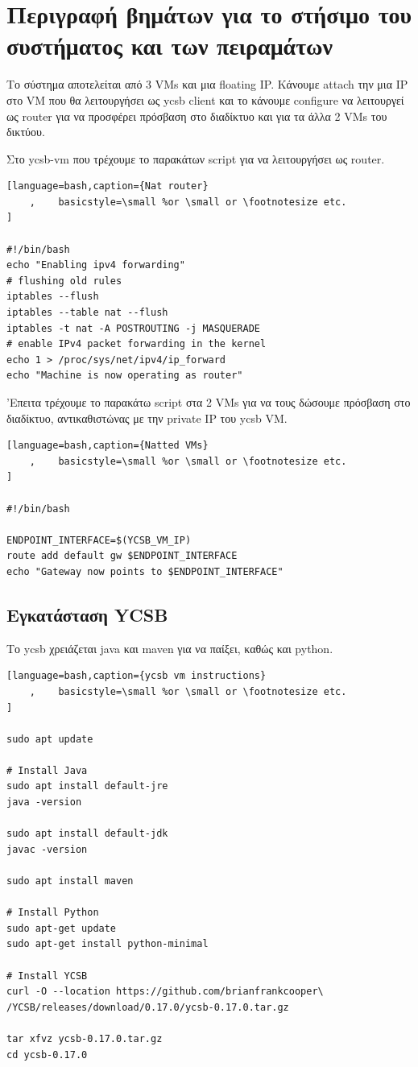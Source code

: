 \documentclass[conference]{IEEEtran}
\begin{document}
\section{Περιγραφή βημάτων για το στήσιμο του συστήματος και των πειραμάτων}
Το σύστημα αποτελείται από 3 VMs και μια floating IP. Κάνουμε attach την μια IP 
στο VM που θα λειτουργήσει ως ycsb client και το κάνουμε configure να λειτουργεί
ως router για να προσφέρει πρόσβαση στο διαδίκτυο και για τα άλλα 2 VMs του δικτύου.

Στο ycsb-vm που τρέχουμε το παρακάτων script για να λειτουργήσει ως router.
\begin{lstlisting}[language=bash,caption={Nat router}
    ,    basicstyle=\small %or \small or \footnotesize etc.
]

#!/bin/bash
echo "Enabling ipv4 forwarding"
# flushing old rules
iptables --flush
iptables --table nat --flush
iptables -t nat -A POSTROUTING -j MASQUERADE
# enable IPv4 packet forwarding in the kernel
echo 1 > /proc/sys/net/ipv4/ip_forward
echo "Machine is now operating as router"
\end{lstlisting}

'Επειτα τρέχουμε το παρακάτω script στα 2 VMs για να τους δώσουμε πρόσβαση στο διαδίκτυο, αντικαθιστώνας με την private IP του ycsb VM.
\begin{lstlisting}[language=bash,caption={Natted VMs}
    ,    basicstyle=\small %or \small or \footnotesize etc.
]

#!/bin/bash

ENDPOINT_INTERFACE=$(YCSB_VM_IP)
route add default gw $ENDPOINT_INTERFACE
echo "Gateway now points to $ENDPOINT_INTERFACE"
\end{lstlisting}


\subsection{Εγκατάσταση YCSB}

Το ycsb χρειάζεται java και maven για να παίξει, καθώς και python.

\begin{lstlisting}[language=bash,caption={ycsb vm instructions}
    ,    basicstyle=\small %or \small or \footnotesize etc.
]

sudo apt update

# Install Java
sudo apt install default-jre
java -version

sudo apt install default-jdk
javac -version

sudo apt install maven

# Install Python 
sudo apt-get update
sudo apt-get install python-minimal

# Install YCSB
curl -O --location https://github.com/brianfrankcooper\
/YCSB/releases/download/0.17.0/ycsb-0.17.0.tar.gz

tar xfvz ycsb-0.17.0.tar.gz
cd ycsb-0.17.0
\end{lstlisting}
\end{document}
